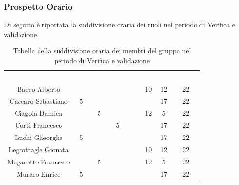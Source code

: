 \subsubsection{Prospetto Orario}
Di seguito è riportata la suddivisione oraria dei ruoli nel periodo di Verifica e validazione.




\begin{table}[H]	
	\begin{center}
	    \begin{tabular}{cccccccc}
			\rowcolor{greySWEight}
			\textcolor{white}{\textbf{Nome}} & \textcolor{white}{\textbf{Re}} & \textcolor{white}{\textbf{Am}} & \textcolor{white}{\textbf{An}} & \textcolor{white}{\textbf{Pj}} & \textcolor{white}{\textbf{Pr}} & \textcolor{white}{\textbf{Ve}} & \textcolor{white}{\textbf{Totale}}
			\\
			Bacco Alberto & & & & & 10 & 12 & 22 \\
			Caccaro Sebastiano & 5 & & & & & 17 & 22 \\
			Ciagola Damien & & 5 & & & 12 & 5 & 22 \\
			Corti Francesco & & & 5 & & & 17 & 22 \\
			Isachi Gheorghe & 5 & & & & & 17 & 22 \\
			Legrottagle Gionata & & & & & 10 & 12 & 22 \\
			Magarotto Francesco & & 5 & & & 12 & 5 & 22 \\
			Muraro Enrico & 5 & & & & & 17 & 22 \\
			\end{tabular}
	    \caption{Tabella della suddivisione oraria dei membri del gruppo nel periodo di Verifica e validazione} \label{tab:tabellaPersoneVerifica e validazione} 
	\end{center}
\end{table}

